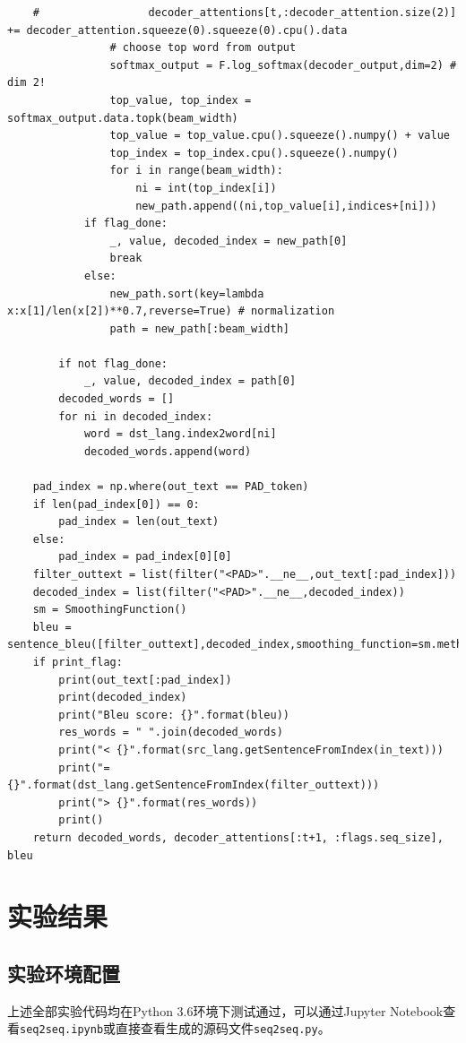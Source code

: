 \documentclass[logo,reportComp]{thesis}
\begin{document}
\begin{lstlisting}
    #                 decoder_attentions[t,:decoder_attention.size(2)] += decoder_attention.squeeze(0).squeeze(0).cpu().data
                # choose top word from output
                softmax_output = F.log_softmax(decoder_output,dim=2) # dim 2!
                top_value, top_index = softmax_output.data.topk(beam_width)
                top_value = top_value.cpu().squeeze().numpy() + value
                top_index = top_index.cpu().squeeze().numpy()
                for i in range(beam_width):
                    ni = int(top_index[i])
                    new_path.append((ni,top_value[i],indices+[ni]))
            if flag_done:
                _, value, decoded_index = new_path[0]
                break
            else:
                new_path.sort(key=lambda x:x[1]/len(x[2])**0.7,reverse=True) # normalization
                path = new_path[:beam_width]

        if not flag_done:
            _, value, decoded_index = path[0]
        decoded_words = []
        for ni in decoded_index:
            word = dst_lang.index2word[ni]
            decoded_words.append(word)

    pad_index = np.where(out_text == PAD_token)
    if len(pad_index[0]) == 0:
        pad_index = len(out_text)
    else:
        pad_index = pad_index[0][0]
    filter_outtext = list(filter("<PAD>".__ne__,out_text[:pad_index]))
    decoded_index = list(filter("<PAD>".__ne__,decoded_index))
    sm = SmoothingFunction()
    bleu = sentence_bleu([filter_outtext],decoded_index,smoothing_function=sm.method4)
    if print_flag:
        print(out_text[:pad_index])
        print(decoded_index)
        print("Bleu score: {}".format(bleu))
        res_words = " ".join(decoded_words)
        print("< {}".format(src_lang.getSentenceFromIndex(in_text)))
        print("= {}".format(dst_lang.getSentenceFromIndex(filter_outtext)))
        print("> {}".format(res_words))
        print()
    return decoded_words, decoder_attentions[:t+1, :flags.seq_size], bleu
\end{lstlisting}

\section{实验结果}
\subsection{实验环境配置}
上述全部实验代码均在Python 3.6环境下测试通过，可以通过Jupyter Notebook查看\verb'seq2seq.ipynb'或直接查看生成的源码文件\verb'seq2seq.py'。
\end{document}
